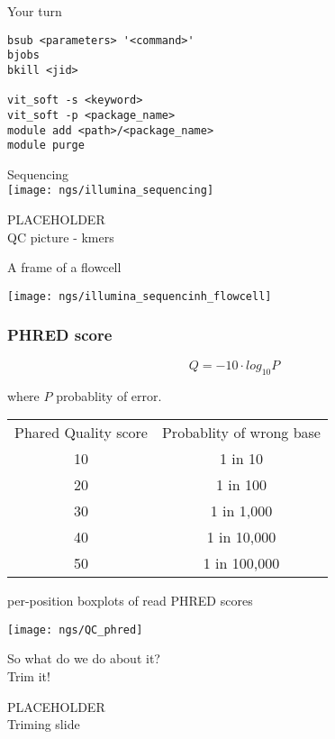 \documentclass[xcolor=dvipsnames]{beamer}
\begin{document}
\begin{frame}[fragile]
	\begin{center}
		\Huge
		Your turn
	\end{center}
\begin{verbatim}
bsub <parameters> '<command>'
bjobs
bkill <jid>

vit_soft -s <keyword>
vit_soft -p <package_name>
module add <path>/<package_name>
module purge
\end{verbatim}
\end{frame}

\begin{frame}
	\begin{center}
		\Huge
		Sequencing\\
		\vspace{1cm}
		\texttt{[image: ngs/illumina\_sequencing]}
	\end{center}
\end{frame}

\begin{frame}
	PLACEHOLDER \\
	QC picture - kmers
\end{frame}

\begin{frame}
	\Huge
	A frame of a flowcell \\
	\begin{center}
		\texttt{[image: ngs/illumina\_sequencinh\_flowcell]}
	\end{center}
\end{frame}

\begin{frame}
	\frametitle{PHRED score}
	$$ Q = -10 \cdot log_{10}P $$

	\vspace{0.5cm}
	\large
	where $P$ probablity of error.

	\vspace{1cm}
	\begin{tabular}{c c}
	Phared Quality score & Probablity of wrong base \\
	10 & 1 in 10  \\
	20 & 1 in 100  \\
	30 & 1 in 1,000 \\
	40 & 1 in 10,000 \\
	50 & 1 in 100,000 \\
	\end{tabular}
\end{frame}

\begin{frame}
	\large
	per-position boxplots of read PHRED scores \\
	\begin{center}
		\texttt{[image: ngs/QC\_phred]}
	\end{center}
\end{frame}

\begin{frame}
	\begin{center}
		So what do we do about it? \\
		Trim it!
	\end{center}
\end{frame}

\begin{frame}
	\begin{center}
		PLACEHOLDER \\
		Triming slide \\
	\end{center}
\end{frame}
\end{document}
